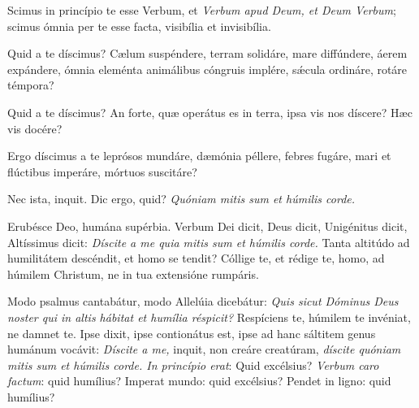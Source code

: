 {\noindent Scimus in princípio te esse Verbum, et \emph{Verbum apud Deum, et Deum Verbum}; scimus ómnia per te esse facta, visibília et invisibília. 

\noindent Quid a te díscimus? Cælum suspéndere, terram solidáre, mare diffúndere, áerem expándere, ómnia eleménta animálibus cóngruis implére, sǽcula ordináre, rotáre témpora? 

\noindent Quid a te díscimus? An forte, quæ operátus es in terra, ipsa vis nos díscere? Hæc vis docére?

\noindent Ergo díscimus a te leprósos mundáre, dæmónia péllere, febres fugáre, mari et flúctibus imperáre, mórtuos suscitáre?

\noindent Nec ista, inquit. Dic ergo, quid? \emph{Quóniam mitis sum et húmilis corde.}

\noindent Erubésce Deo, humána supérbia. Verbum Dei dicit, Deus dicit, Unigénitus dicit, Altíssimus dicit: \emph{Díscite a me quia mitis sum et húmilis corde.} Tanta altitúdo ad humilitátem descéndit, et homo se tendit? Cóllige te, et rédige te, homo, ad húmilem Christum, ne in tua extensióne rumpáris.

\noindent Modo psalmus cantabátur, modo Allelúia dicebátur: \emph{Quis sicut Dóminus Deus noster qui in altis hábitat et humília réspicit?} Respíciens te, húmilem te invéniat, ne damnet te. Ipse dixit, ipse contionátus est, ipse ad hanc sáltitem genus humánum vocávit: \emph{Díscite a me,} inquit, non creáre creatúram, \emph{díscite quóniam mitis sum et húmilis corde. In princípio erat}: Quid excélsius? \emph{Verbum caro factum}: quid humílius? Imperat mundo: quid excélsius? Pendet in ligno: quid humílius?

\vfill
\pagebreak

 

\vspace{-5mm}

\vfill
\pagebreak
}
\newcommand{\benedictus}{\pars{Canticum Zachariæ.}  \scriptura{Mt. 13, 54-55}

\vspace{-4mm}

\antiphona{VIII G}{temporalia/ant-etdicebantunde.gtex}

\vspace{-2mm}

\scriptura{Lc. 1, 68-79}

\vspace{-2mm}

\cantusSineNeumas
\initiumpsalmi{temporalia/benedictus-initium-viiisoll-G-auto.gtex}


 \Abardot{}}


